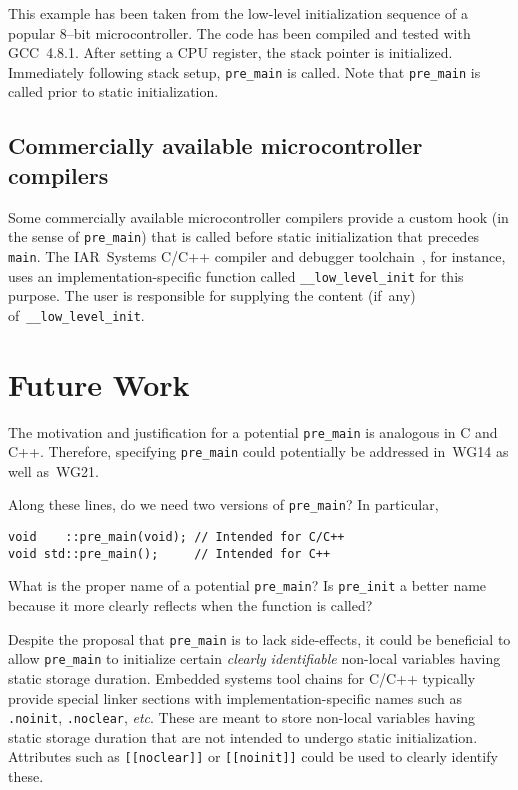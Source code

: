 \documentclass[11pt]{article}
\begin{document}
This example has been taken from the low-level
initialization sequence of a popular 8--bit microcontroller.
The code has been compiled and tested with GCC~4.8.1.
After setting a CPU register, the stack pointer is initialized.
Immediately following stack setup, \lstinline{pre_main} is called.
Note that \lstinline{pre_main} is called prior to
static initialization.

\subsection*{Commercially available microcontroller compilers}

Some commercially available microcontroller compilers provide
a custom hook (in the sense of \lstinline{pre_main}) that
is called before static initialization that precedes \lstinline{main}.
The IAR~Systems C/C++ compiler and debugger toolchain~\cite{bib:iar2015},
for instance, uses an implementation-specific function
called \lstinline{__low_level_init} for this purpose.
The user is responsible for supplying the content (if~any)
of~\lstinline{__low_level_init}.

\section{Future Work}

The motivation and justification for a potential \lstinline{pre_main}
is analogous in C and C++. Therefore, specifying \lstinline{pre_main}
could potentially be addressed in~WG14 as well as~WG21.

Along these lines, do we need two versions of \lstinline{pre_main}?
In particular,

\begin{lstlisting}
void    ::pre_main(void); // Intended for C/C++
void std::pre_main();     // Intended for C++
\end{lstlisting}

What is the proper name of a potential \lstinline{pre_main}?
Is \lstinline{pre_init} a better name because it
more clearly reflects when the function is called?

Despite the proposal that \lstinline{pre_main} is to lack side-effects,
it could be beneficial to allow \lstinline{pre_main} to initialize certain
\emph{clearly} \emph{identifiable} non-local variables
having static storage duration.
Embedded systems tool chains for C/C++ typically provide special
linker sections with implementation-specific names such as
\lstinline{.noinit}, \lstinline{.noclear}, \emph{etc}. These are meant
to store non-local variables having static storage duration that are not
intended to undergo static initialization.
Attributes such as \lstinline{[[noclear]]} or \lstinline{[[noinit]]}
could be used to clearly identify these.
\end{document}
